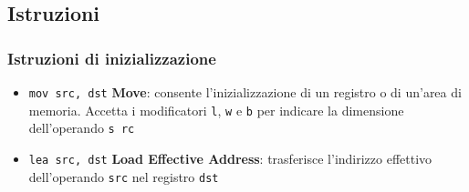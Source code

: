\documentclass[a4paper]{article}
\theoremstyle{break}
\theoremstyle{break}
\theoremstyle{break}
\theoremstyle{break}
\begin{document}
\subsection{Istruzioni}
\subsubsection{Istruzioni di inizializzazione}
\begin{itemize}
	\item \texttt{mov src, dst} \quad \textbf{Move}: consente l'inizializzazione di un registro o di
	      un'area di memoria. Accetta i modificatori \texttt{l}, \texttt{w} e \texttt{b} per
	      indicare la dimensione dell'operando \texttt{s rc}
	\item \texttt{lea src, dst} \quad \textbf{Load Effective Address}: trasferisce l'indirizzo
	      effettivo dell'operando \texttt{src} nel registro \texttt{dst}
\end{itemize}
\end{document}
